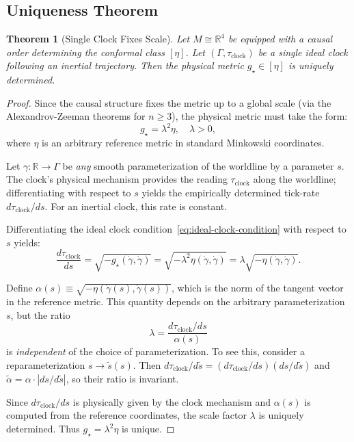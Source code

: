 \documentclass[aps,prd,twocolumn,nofootinbib,superscriptaddress]{revtex4-2}
\newtheorem{theorem}{Theorem}
\begin{document}
\subsection{Uniqueness Theorem}

\begin{theorem}[Single Clock Fixes Scale]
Let $M \cong \mathbb{R}^4$ be equipped with a causal order determining the conformal class $[\eta]$. Let $(\Gamma, \tau_{\mathrm{clock}})$ be a single ideal clock following an inertial trajectory. Then the physical metric $g_\star \in [\eta]$ is uniquely determined.
\end{theorem}

\begin{proof}
Since the causal structure fixes the metric up to a global scale (via the Alexandrov-Zeeman theorems for $n \ge 3$), the physical metric must take the form:
\begin{equation}
g_\star = \lambda^2 \eta, \quad \lambda > 0,
\end{equation}
where $\eta$ is an arbitrary reference metric in standard Minkowski coordinates.

Let $\gamma: \mathbb{R} \to \Gamma$ be \emph{any} smooth parameterization of the worldline by a parameter $s$. The clock's physical mechanism provides the reading $\tau_{\mathrm{clock}}$ along the worldline; differentiating with respect to $s$ yields the empirically determined tick-rate $d\tau_{\mathrm{clock}}/ds$. For an inertial clock, this rate is constant.

Differentiating the ideal clock condition~\eqref{eq:ideal-clock-condition} with respect to $s$ yields:
\begin{equation}
\frac{d\tau_{\mathrm{clock}}}{ds} = \sqrt{-g_\star(\dot{\gamma}, \dot{\gamma})} = \sqrt{-\lambda^2 \eta(\dot{\gamma}, \dot{\gamma})} = \lambda \sqrt{-\eta(\dot{\gamma}, \dot{\gamma})}.
\end{equation}

Define $\alpha(s) \equiv \sqrt{-\eta(\dot{\gamma}(s), \dot{\gamma}(s))}$, which is the norm of the tangent vector in the reference metric. This quantity depends on the arbitrary parameterization $s$, but the ratio
\begin{equation}
\lambda = \frac{d\tau_{\mathrm{clock}}/ds}{\alpha(s)}
\end{equation}
is \emph{independent} of the choice of parameterization. To see this, consider a reparameterization $s \to \tilde{s}(s)$. Then $d\tau_{\mathrm{clock}}/d\tilde{s} = (d\tau_{\mathrm{clock}}/ds)(ds/d\tilde{s})$ and $\tilde{\alpha} = \alpha \cdot |ds/d\tilde{s}|$, so their ratio is invariant.

Since $d\tau_{\mathrm{clock}}/ds$ is physically given by the clock mechanism and $\alpha(s)$ is computed from the reference coordinates, the scale factor $\lambda$ is uniquely determined. Thus $g_\star = \lambda^2 \eta$ is unique.
\end{proof}
\end{document}
